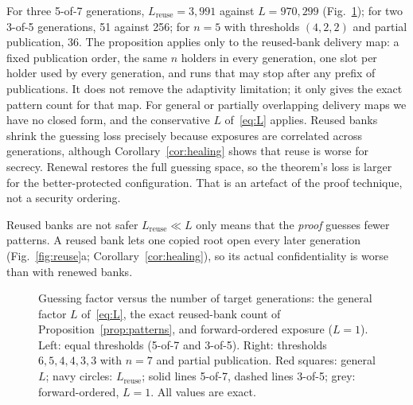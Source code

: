 \documentclass[pdflatex,sn-mathphys-num,twocolumn]{sn-jnl}
\theoremstyle{plain}
\theoremstyle{definition}
\begin{document}
For three 5-of-7 generations, $L_{\mathrm{reuse}}=3{,}991$ against $L=970{,}299$ (Fig.~\ref{fig:guess}); for two 3-of-5 generations, 51 against 256; for $n=5$ with thresholds $(4,2,2)$ and partial publication, 36. The proposition applies only to the reused-bank delivery map: a fixed publication order, the same $n$ holders in every generation, one slot per holder used by every generation, and runs that may stop after any prefix of publications. It does not remove the adaptivity limitation; it only gives the exact pattern count for that map. For general or partially overlapping delivery maps we have no closed form, and the conservative $L$ of~\eqref{eq:L} applies. Reused banks shrink the guessing loss precisely because exposures are correlated across generations, although Corollary~\ref{cor:healing} shows that reuse is worse for secrecy. Renewal restores the full guessing space, so the theorem's loss is larger for the better-protected configuration. That is an artefact of the proof technique, not a security ordering.

\begin{warnbox}{Reused banks are not safer}
$L_{\mathrm{reuse}}\ll L$ only means that the \emph{proof} guesses fewer patterns. A reused bank lets one copied root open every later generation (Fig.~\ref{fig:reuse}a; Corollary~\ref{cor:healing}), so its actual confidentiality is worse than with renewed banks.
\end{warnbox}

\begin{figure}[t]
\centering

\caption{Guessing factor versus the number of target generations: the general factor $L$ of~\eqref{eq:L}, the exact reused-bank count of Proposition~\ref{prop:patterns}, and forward-ordered exposure ($L=1$). Left: equal thresholds (5-of-7 and 3-of-5). Right: thresholds $6,5,4,4,3,3$ with $n=7$ and partial publication. Red squares: general $L$; navy circles: $L_{\mathrm{reuse}}$; solid lines 5-of-7, dashed lines 3-of-5; grey: forward-ordered, $L=1$. All values are exact.}\label{fig:guess}
\end{figure}
\end{document}
